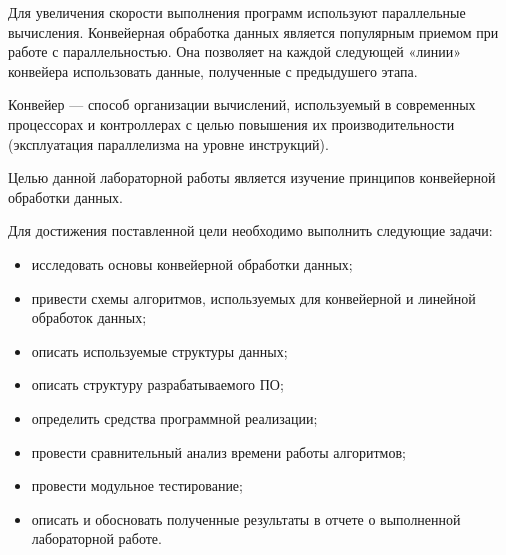 \Introduction

\setcounter{page}{2}


Для увеличения скорости выполнения программ используют параллельные вычисления. Конвейерная обработка данных является популярным приемом при работе с параллельностью. Она позволяет на каждой следующей «линии» конвейера использовать данные, полученные с предыдушего этапа.

Конвейер — способ организации вычислений, используемый в современных процессорах и контроллерах с целью повышения их производительности (эксплуатация параллелизма на уровне инструкций).

Целью данной лабораторной работы является изучение принципов конвейерной обработки данных.

Для достижения поставленной цели необходимо выполнить следующие задачи:

\begin{itemize}
	\item исследовать основы конвейерной обработки данных;
	\item привести схемы алгоритмов, используемых для конвейерной и линейной обработок данных;
	\item описать используемые структуры данных;
	\item описать структуру разрабатываемого ПО;
	\item определить средства программной реализации;
	\item провести сравнительный анализ времени работы алгоритмов;
	\item провести модульное тестирование;
	\item описать и обосновать полученные результаты в отчете о выполненной лабораторной работе.
\end{itemize}



